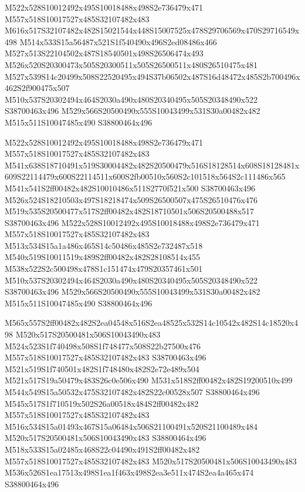 \documentclass{article}
\begin{document}
\begin{multicols}{2}
M522x528S10012492x495S10018488x498S2e736479x471 M557x518S10017527x485S32107482x483 M616x517S32107482x482S15021544x448S15007525x478S29706569x470S29716549x498 M514x533S15a56487x521S1f540490x496S2ed08486x466 M527x513S22104502x487S18540501x498S26506474x493 M526x520S20300473x505S20300511x505S26500511x480S26510475x481 M527x539S14c20499x508S22520495x494S37b06502x487S16d48472x485S2b700496x462S2f900475x507 M510x537S20302494x464S2030a490x480S20340495x505S20348490x522 S38700463x496 M529x566S20500490x555S10043499x531S30a00482x482 M515x511S10047485x490 S38800464x496

M522x528S10012492x495S10018488x498S2e736479x471 M557x518S10017527x485S32107482x483 M541x638S18710491x519S30004482x482S20500479x516S18128514x608S18128481x609S22114479x600S22114511x600S2fb00510x560S2c101518x564S2c111486x565 M541x541S2ff00482x482S10010486x511S2770f521x500 S38700463x496 M526x524S18210503x497S18218474x509S26500507x475S26510476x476 M519x535S20500477x517S2ff00482x482S18710501x506S20500488x517 S38700463x496 M522x528S10012492x495S10018488x498S2e736479x471 M557x518S10017527x485S32107482x483 M513x534S15a1a486x465S14c50486x485S2e732487x518 M540x519S10011519x489S2ff00482x482S28108514x455 M538x522S2c500498x478S1c151474x479S20357461x501 M510x537S20302494x464S2030a490x480S20340495x505S20348490x522 S38700463x496 M529x566S20500490x555S10043499x531S30a00482x482 M515x511S10047485x490 S38800464x496

M565x557S2ff00482x482S2ea04548x516S2ea48525x532S14c10542x482S14c18520x498 M520x517S20500481x506S10043490x483 M524x523S1f740498x508S1f748477x508S22b27500x476 M557x518S10017527x485S32107482x483 S38700463x496 M521x519S1f740501x482S1f748480x482S2e72e489x504 M521x517S19a50479x483S26c0e506x490 M531x518S2ff00482x482S19200510x499 M544x549S15a50532x475S32107482x482S22c00528x507 S38800464x496 M545x517S1f710519x502S26a00518x484S2ff00482x482 M557x518S10017527x485S32107482x483 M516x534S15a01493x467S15a06484x506S21100491x520S21100489x484 M520x517S20500481x506S10043490x483 S38800464x496 M518x533S15a02485x468S22c04490x491S2ff00482x482 M557x518S10017527x485S32107482x483 M520x517S20500481x506S10043490x483 M536x526S1ea17513x498S1ea1f463x498S2ea3e511x474S2ea4a465x474 S38800464x496


\end{multicols}
\end{document}

